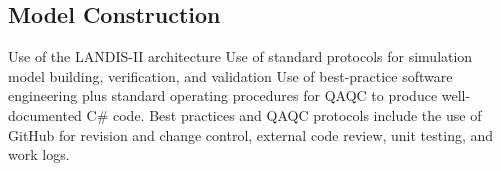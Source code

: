 \newpage
\subsection{Model Construction}
\begin{outline}[enumerate]
\1 Use of the LANDIS-II architecture \citep{scheller_design_2007}
\1 Use of standard protocols for simulation model building, verification, and validation \citep{haefner_modeling_2005, law_simulation_2006}
\1 Use of best-practice software engineering plus standard operating procedures for QAQC to produce well-documented C\# code. Best practices and QAQC protocols include the use of GitHub for revision and change control, external code review, unit testing, and work logs. 
\1  
\end{outline}
 
